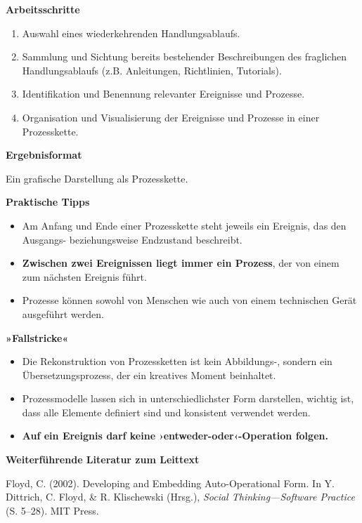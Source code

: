 \documentclass[
  a4paper,
]{book}
\providecommand{\tightlist}{%
  \setlength{\itemsep}{0pt}\setlength{\parskip}{0pt}}
\begin{document}
\textbf{Arbeitsschritte}

\begin{enumerate}
\def\labelenumi{\arabic{enumi}.}
\tightlist
\item
  Auswahl eines wiederkehrenden Handlungsablaufs.
\item
  Sammlung und Sichtung bereits bestehender Beschreibungen des fraglichen Handlungsablaufs (z.B. Anleitungen, Richtlinien, Tutorials).
\item
  Identifikation und Benennung relevanter Ereignisse und Prozesse.
\item
  Organisation und Visualisierung der Ereignisse und Prozesse in einer Prozesskette.
\end{enumerate}

\textbf{Ergebnisformat}

Ein grafische Darstellung als Prozesskette.

\textbf{Praktische Tipps}

\begin{itemize}
\tightlist
\item
  Am Anfang und Ende einer Prozesskette steht jeweils ein Ereignis, das den Ausgangs- beziehungsweise Endzustand beschreibt.
\item
  \textbf{Zwischen zwei Ereignissen liegt immer ein Prozess}, der von einem zum nächsten Ereignis führt.
\item
  Prozesse können sowohl von Menschen wie auch von einem technischen Gerät ausgeführt werden.
\end{itemize}

\textbf{»Fallstricke«}

\begin{itemize}
\tightlist
\item
  Die Rekonstruktion von Prozessketten ist kein Abbildungs-, sondern ein Übersetzungsprozess, der ein kreatives Moment beinhaltet.
\item
  Prozessmodelle lassen sich in unterschiedlichster Form darstellen, wichtig ist, dass alle Elemente definiert sind und konsistent verwendet werden.
\item
  \textbf{Auf ein Ereignis darf keine ›entweder-oder‹-Operation folgen.}
\end{itemize}

\textbf{Weiterführende Literatur zum Leittext}

Floyd, C. (2002). Developing and Embedding Auto-Operational Form. In Y. Dittrich, C. Floyd, \& R. Klischewski (Hrsg.), \emph{Social Thinking---Software Practice} (S. 5--28). MIT Press.
\end{document}

